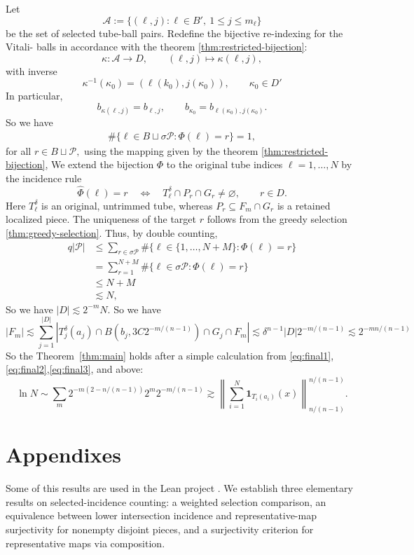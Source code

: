 \documentclass[11pt, letterpaper]{nyjm}
\begin{document}
	Let
	\[
	\mathcal A
	:=
	\{(\ell,j):\ell\in B',\ 1\le j\le m_\ell\}
	\]
	be the set of selected tube-ball pairs.
	Redefine the bijective re-indexing for the Vitali- balls in accordance with the theorem \ref{thm:restricted-bijection}:
	\[
	\kappa:\mathcal A\longrightarrow D,
	\qquad
	(\ell,j)\longmapsto \kappa(\ell,j),
	\]
	with inverse
	\[
	\kappa^{-1}(\kappa_0)
	=
	(\ell(k_0),j(\kappa_0)),
	\qquad \kappa_0 \in D'
	\]
	In particular,
	\[
	b_{\kappa(\ell,j)}=b_{\ell,j},
	\qquad
	b_{\kappa_0}=b_{\ell(\kappa_0),j(\kappa_0)}.
	\] 
	So we have
	\[
	\begin{aligned}
	\#\{\ell \in B \sqcup \sigma \mathcal P: \Phi(\ell) = r\} 
	= 1, 
	\end{aligned}
	\]
	for all $r \in  B \sqcup \mathcal P,$
	using the mapping given by the theorem \ref{thm:restricted-bijection},
	We extend the bijection $\Phi$ to the original tube
	indices $\ell=1,\ldots,N$ by the incidence rule
	\[
	\widehat{\Phi}(\ell)=r
	\quad\Longleftrightarrow\quad
	T_\ell^\delta\cap P_r\cap G_r\ne\varnothing,
	\qquad r\in D.
	\]
	Here $T_\ell^\delta$ is an original, untrimmed tube,
	whereas $P_r\subseteq F_m\cap G_r$ is a retained
	localized piece.
	The uniqueness of the target $r$ follows from the greedy selection \ref{thm:greedy-selection}.  
	Thus, by double counting,
	\[
	\begin{aligned}
		q|\mathcal P|
		&\leq 
	    \sum_{r \in \sigma \mathcal P}
		\#\{\ell \in \{1,\ldots,N+M\}: \Phi(\ell) = r\}  \\
		&= 
		\sum_{r = 1}^{N+M}
		\#\{\ell \in \sigma \mathcal P: \Phi(\ell) = r\}  \\
		&\leq N + M \\
		&\lesssim N
		,
	\end{aligned}
	\]
	So we have $|D| \lesssim 2^{-m}N.$
	So we have 
	\begin{equation}
		|F_m| \lesssim \sum_ {j=1}^{|D|}|T^\delta_j(a_j) \cap B(b_{j},3C2^{-m/(n-1)}) \cap G_j \cap F_m| \lesssim \delta^{n-1}|D|2^{-m/(n-1)} \lesssim 2^{-mn/(n-1)} 
	\end{equation}
	So the Theorem~\ref{thm:main} holds after a simple calculation from \eqref{eq:final1}, \eqref{eq:final2},\eqref{eq:final3}, and above:
	\[
	\ln N \sim \sum_m 2^{-m(2-n/(n-1))} 2^{m}2^{-m/(n-1)}
	\gtrsim \left\| \sum_{i=1}^{N} \mathbf{1}_{T_i(a_i)}(x)
	\right\|_{n/(n-1)}^{n/(n-1)}.
	\] 
	
	\section{Appendixes}
	\appendix
	Some of this results are used in the Lean project \cite{Aspegren2026Lean}.
	We establish three elementary results on selected-incidence counting: a weighted selection comparison, an equivalence between lower intersection incidence and representative-map surjectivity for nonempty disjoint pieces, and a surjectivity criterion for representative maps via composition. 
	
\end{document}
